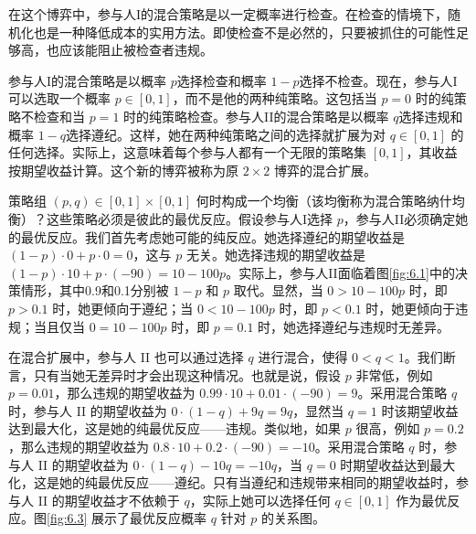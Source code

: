 在这个博弈中，参与人I的混合策略是以一定概率进行检查。在检查的情境下，随机化也是一种降低成本的实用方法。即使检查不是必然的，只要被抓住的可能性足够高，也应该能阻止被检查者违规。

参与人I的混合策略是以概率 \(p\)选择检查和概率 \(1 - p\)选择不检查。现在，参与人I可以选取一个概率 \(p \in  \left\lbrack  {0,1}\right\rbrack\)，而不是他的两种纯策略。这包括当 \(p = 0\) 时的纯策略不检查和当 \(p = 1\) 时的纯策略检查。参与人II的混合策略是以概率 \(q\)选择违规和概率 \(1 - q\)选择遵纪。这样，她在两种纯策略之间的选择就扩展为对 \(q \in  \left\lbrack  {0,1}\right\rbrack\) 的任何选择。实际上，这意味着每个参与人都有一个无限的策略集 \(\left\lbrack  {0,1}\right\rbrack\)，其收益按期望收益计算。这个新的博弈被称为原 \(2 \times  2\) 博弈的混合扩展。

策略组 \(\left( {p,q}\right)  \in  \left\lbrack  {0,1}\right\rbrack   \times  \left\lbrack  {0,1}\right\rbrack\) 何时构成一个均衡（该均衡称为混合策略纳什均衡）？这些策略必须是彼此的最优反应。假设参与人I选择 \(p\)，参与人II必须确定她的最优反应。我们首先考虑她可能的纯反应。她选择遵纪的期望收益是 \(\left( {1 - p}\right)  \cdot  0 + p \cdot  0 = 0\)，这与 \(p\) 无关。她选择违规的期望收益是 \(\left( {1 - p}\right)  \cdot  {10} + p \cdot  \left( {-{90}}\right)  = {10} - {100p}\)。实际上，参与人II面临着图\ref{fig:6.1}中的决策情形，其中0.9和0.1分别被 \(1 - p\) 和 \(p\) 取代。显然，当 \(0 > {10} - {100p}\) 时，即 \(p > {0.1}\) 时，她更倾向于遵纪；当 \(0 < {10} - {100p}\) 时，即 \(p < {0.1}\) 时，她更倾向于违规；当且仅当 \(0 = {10} - {100p}\) 时，即 \(p = {0.1}\) 时，她选择遵纪与违规时无差异。

在混合扩展中，参与人 II 也可以通过选择 \(q\) 进行混合，使得 \(0 < q < 1\)。我们断言，只有当她无差异时才会出现这种情况。也就是说，假设 \(p\) 非常低，例如 \(p = {0.01}\)，那么违规的期望收益为 \({0.99} \cdot  {10} + {0.01} \cdot  \left( {-{90}}\right)  = 9\)。采用混合策略 \(q\) 时，参与人 II 的期望收益为 \(0 \cdot  \left( {1 - q}\right)  + {9q} = {9q}\)，显然当 \(q = 1\) 时该期望收益达到最大化，这是她的纯最优反应——违规。类似地，如果 \(p\) 很高，例如 \(p = {0.2}\)，那么违规的期望收益为 \({0.8} \cdot  {10} + {0.2} \cdot  \left( {-{90}}\right)  =  - {10}\)。采用混合策略 \(q\) 时，参与人 II 的期望收益为 \(0 \cdot  \left( {1 - q}\right)  - {10q} =  - {10q}\)，当 \(q = 0\) 时期望收益达到最大化，这是她的纯最优反应——遵纪。只有当遵纪和违规带来相同的期望收益时，参与人 II 的期望收益才不依赖于 \(q\)，实际上她可以选择任何 \(q \in  \left\lbrack  {0,1}\right\rbrack\) 作为最优反应。图\ref{fig:6.3} 展示了最优反应概率 \(q\) 针对 \(p\) 的关系图。

